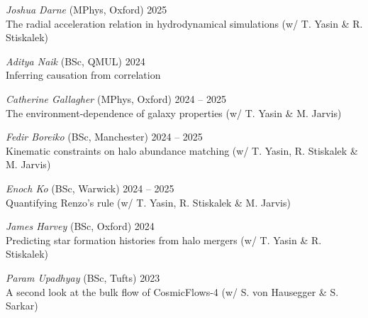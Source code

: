 \documentclass[11pt]{article}
\begin{document}
\vspace{-0.5\baselineskip}

\textit{Joshua Darne} (MPhys, Oxford) \hfill 2025\\
The radial acceleration relation in hydrodynamical simulations (w/ T. Yasin \& R. Stiskalek)\\

\vspace{-0.5\baselineskip}

\textit{Aditya Naik} (BSc, QMUL) \hfill 2024\\
Inferring causation from correlation\\

\vspace{-0.5\baselineskip}

\textit{Catherine Gallagher} (MPhys, Oxford) \hfill 2024 -- 2025\\
The environment-dependence of galaxy properties (w/ T. Yasin \& M. Jarvis)\\

\vspace{-0.5\baselineskip}

\textit{Fedir Boreiko} (BSc, Manchester) \hfill 2024 -- 2025\\
Kinematic constraints on halo abundance matching (w/ T. Yasin, R. Stiskalek \& M. Jarvis)\\

\vspace{-0.5\baselineskip}

\textit{Enoch Ko} (BSc, Warwick) \hfill 2024 -- 2025\\
Quantifying Renzo's rule (w/ T. Yasin, R. Stiskalek \& M. Jarvis)\\

\vspace{-0.5\baselineskip}

\textit{James Harvey} (BSc, Oxford) \hfill 2024\\
Predicting star formation histories from halo mergers (w/ T. Yasin \& R. Stiskalek)\\

\vspace{-0.5\baselineskip}

\textit{Param Upadhyay} (BSc, Tufts) \hfill 2023\\
A second look at the bulk flow of CosmicFlows-4 (w/ S. von Hausegger \& S. Sarkar)\\

\vspace{-0.5\baselineskip}
\end{document}
